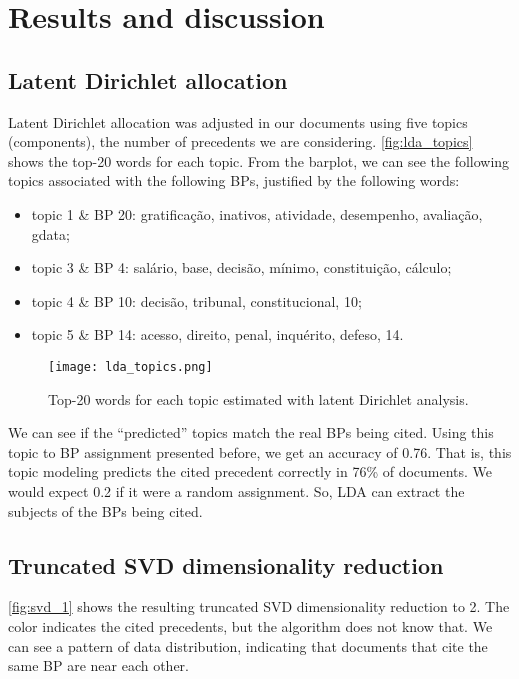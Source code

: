 \section{Results and discussion}
    \label{sec:results}

    \subsection{Latent Dirichlet allocation}

        Latent Dirichlet allocation was adjusted in our documents using five topics (components), the number of precedents we are considering. \autoref{fig:lda_topics} shows the top-20 words for each topic. From the barplot, we can see the following topics associated with the following BPs, justified by the following words:
        \begin{itemize}
                \item topic 1 \& BP 20: gratificação, inativos, atividade, desempenho, avaliação, gdata;
                \item topic 3 \& BP 4: salário, base, decisão, mínimo, constituição, cálculo;
                \item topic 4 \& BP 10: decisão, tribunal, constitucional, 10;
                \item topic 5 \& BP 14: acesso, direito, penal, inquérito, defeso, 14.
        \end{itemize}

        \begin{figure*}[!h]
                \texttt{[image: lda\_topics.png]}
                \caption{Top-20 words for each topic estimated with latent Dirichlet analysis.}
                \label{fig:lda_topics}
        \end{figure*}

        We can see if the ``predicted'' topics match the real BPs being cited. Using this topic to BP assignment presented before, we get an accuracy of 0.76. That is, this topic modeling predicts the cited precedent correctly in 76\% of documents. We would expect 0.2 if it were a random assignment. So, LDA can extract the subjects of the BPs being cited.

    \subsection{Truncated SVD dimensionality reduction}

        \autoref{fig:svd_1} shows the resulting truncated SVD dimensionality reduction to 2. The color indicates the cited precedents, but the algorithm does not know that. We can see a pattern of data distribution, indicating that documents that cite the same BP are near each other.

